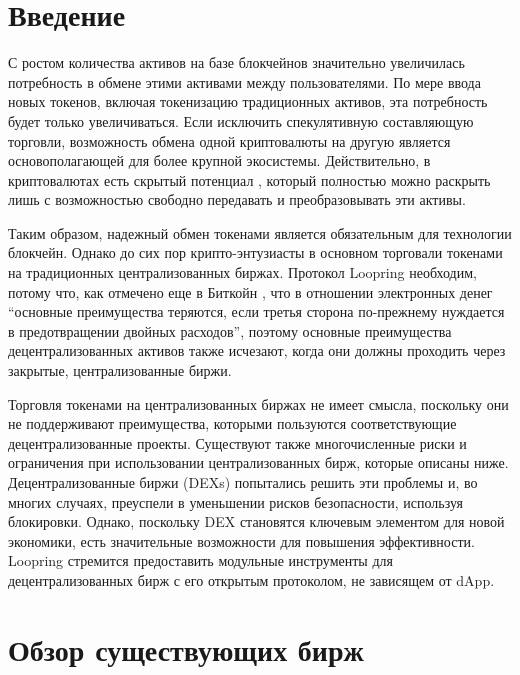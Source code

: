 \documentclass[utf8,nofonts]{article}
\begin{document}
\begin{multicols}{2}
	\section{Введение\label{sec:introduction}}
	
	С ростом количества активов на базе блокчейнов значительно увеличилась потребность в обмене этими активами между пользователями. По мере ввода новых токенов, включая токенизацию традиционных активов, эта потребность будет только увеличиваться. Если исключить спекулятивную составляющую торговли, возможность обмена одной криптовалюты на другую является основополагающей для более крупной экосистемы. Действительно, в криптовалютах есть скрытый потенциал \cite{desotocapital}, который полностью можно раскрыть лишь с возможностью свободно передавать и преобразовывать эти активы. 
	
	Таким образом, надежный обмен токенами является обязательным для технологии блокчейн. Однако до сих пор крипто-энтузиасты в основном торговали токенами на традиционных централизованных биржах. Протокол Loopring необходим, потому что, как отмечено еще в Биткойн \cite{nakamoto2008bitcoin}, что в отношении электронных денег \enquote{основные преимущества теряются, если третья сторона по-прежнему нуждается в предотвращении двойных расходов}, поэтому основные преимущества децентрализованных активов также исчезают, когда они должны проходить через закрытые, централизованные биржи.  
	
	Торговля токенами на централизованных биржах не имеет смысла, поскольку они не поддерживают преимущества, которыми пользуются соответствующие децентрализованные проекты. Существуют также многочисленные риски и ограничения при использовании централизованных бирж, которые описаны ниже. Децентрализованные биржи (DEXs) \cite{schuh2015bitshares} \cite{bancor} \cite{kyber} попытались решить эти проблемы и, во многих случаях, преуспели в уменьшении рисков безопасности, используя блокировки. Однако, поскольку DEX становятся ключевым элементом для новой экономики, есть значительные возможности для повышения эффективности. Loopring стремится предоставить модульные инструменты для децентрализованных бирж с его открытым протоколом, не зависящем от dApp.
	
	\section{Обзор существующих бирж\label{sec:current_exchange_landscape}}
	

\end{multicols}
\end{document}
